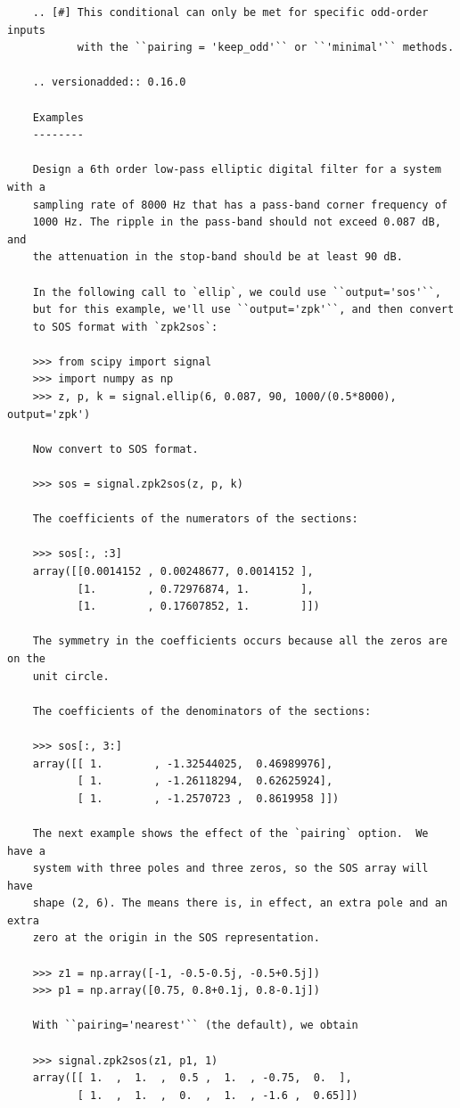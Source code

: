 \documentclass[12pt,a4paper]{article}
\begin{document}
\begin{itemize}
\begin{verbatim}
    .. [#] This conditional can only be met for specific odd-order inputs
           with the ``pairing = 'keep_odd'`` or ``'minimal'`` methods.

    .. versionadded:: 0.16.0

    Examples
    --------

    Design a 6th order low-pass elliptic digital filter for a system with a
    sampling rate of 8000 Hz that has a pass-band corner frequency of
    1000 Hz. The ripple in the pass-band should not exceed 0.087 dB, and
    the attenuation in the stop-band should be at least 90 dB.

    In the following call to `ellip`, we could use ``output='sos'``,
    but for this example, we'll use ``output='zpk'``, and then convert
    to SOS format with `zpk2sos`:

    >>> from scipy import signal
    >>> import numpy as np
    >>> z, p, k = signal.ellip(6, 0.087, 90, 1000/(0.5*8000), output='zpk')

    Now convert to SOS format.

    >>> sos = signal.zpk2sos(z, p, k)

    The coefficients of the numerators of the sections:

    >>> sos[:, :3]
    array([[0.0014152 , 0.00248677, 0.0014152 ],
           [1.        , 0.72976874, 1.        ],
           [1.        , 0.17607852, 1.        ]])

    The symmetry in the coefficients occurs because all the zeros are on the
    unit circle.

    The coefficients of the denominators of the sections:

    >>> sos[:, 3:]
    array([[ 1.        , -1.32544025,  0.46989976],
           [ 1.        , -1.26118294,  0.62625924],
           [ 1.        , -1.2570723 ,  0.8619958 ]])

    The next example shows the effect of the `pairing` option.  We have a
    system with three poles and three zeros, so the SOS array will have
    shape (2, 6). The means there is, in effect, an extra pole and an extra
    zero at the origin in the SOS representation.

    >>> z1 = np.array([-1, -0.5-0.5j, -0.5+0.5j])
    >>> p1 = np.array([0.75, 0.8+0.1j, 0.8-0.1j])

    With ``pairing='nearest'`` (the default), we obtain

    >>> signal.zpk2sos(z1, p1, 1)
    array([[ 1.  ,  1.  ,  0.5 ,  1.  , -0.75,  0.  ],
           [ 1.  ,  1.  ,  0.  ,  1.  , -1.6 ,  0.65]])


\end{verbatim}
\end{itemize}
\end{document}
